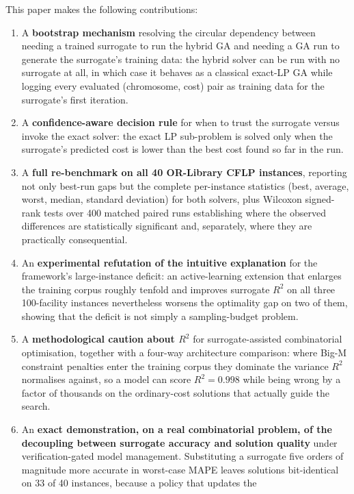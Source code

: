 \documentclass[conference]{IEEEtran}
\begin{document}
This paper makes the following contributions:
\begin{enumerate}
    \item A \textbf{bootstrap mechanism} resolving the circular dependency
    between needing a trained surrogate to run the hybrid GA and needing a GA
    run to generate the surrogate's training data: the hybrid solver can be
    run with no surrogate at all, in which case it behaves as a classical
    exact-LP GA while logging every evaluated (chromosome, cost) pair as
    training data for the surrogate's first iteration.
    \item A \textbf{confidence-aware decision rule} for when to trust the
    surrogate versus invoke the exact solver: the exact LP sub-problem is
    solved only when the surrogate's predicted cost is lower than the best
    cost found so far in the run.
    \item A \textbf{full re-benchmark on all 40 OR-Library CFLP instances},
    reporting not only best-run gaps but the complete per-instance statistics
    (best, average, worst, median, standard deviation) for both solvers, plus
    Wilcoxon signed-rank tests over 400 matched paired runs establishing where
    the observed differences are statistically significant and, separately,
    where they are practically consequential.
    \item An \textbf{experimental refutation of the intuitive explanation} for
    the framework's large-instance deficit: an active-learning extension that
    enlarges the training corpus roughly tenfold and improves surrogate $R^2$
    on all three 100-facility instances nevertheless worsens the optimality
    gap on two of them, showing that the deficit is not simply a
    sampling-budget problem.
    \item A \textbf{methodological caution about $R^2$} for surrogate-assisted
    combinatorial optimisation, together with a four-way architecture
    comparison: where Big-M constraint penalties enter the training corpus
    they dominate the variance $R^2$ normalises against, so a model can score
    $R^2 = 0.998$ while being wrong by a factor of thousands on the
    ordinary-cost solutions that actually guide the search.
    \item An \textbf{exact demonstration, on a real combinatorial problem, of
    the decoupling between surrogate accuracy and solution quality} under
    verification-gated model management. Substituting a surrogate five orders
    of magnitude more accurate in worst-case MAPE leaves solutions
    bit-identical on 33 of 40 instances, because a policy that updates the

\end{enumerate}
\end{document}
